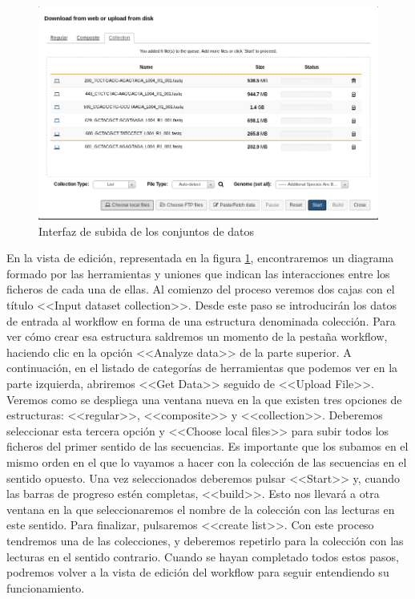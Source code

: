 \begin{figure}[!h]
    \begin{center}
      \includegraphics[scale=0.55]{images/SubidaDatasets.png}
      \caption{Interfaz de subida de los conjuntos de datos}
      \label{fig:SubidaDatasets}
    \end{center}
\end{figure}

En la vista de edición, representada en la figura \ref{fig:SubidaDatasets}, encontraremos un diagrama formado por las herramientas y uniones que indican las interacciones entre los ficheros de cada una de ellas. Al comienzo del proceso veremos dos cajas con el título <<Input dataset collection>>. Desde este paso se introducirán los datos de entrada al workflow en forma de una estructura denominada colección. Para ver cómo crear esa estructura saldremos un momento de la pestaña workflow, haciendo clic en la opción <<Analyze data>> de la parte superior. A continuación, en el listado de categorías de herramientas que podemos ver en la parte izquierda, abriremos <<Get Data>> seguido de <<Upload File>>. Veremos como se despliega una ventana nueva en la que existen tres opciones de estructuras: <<regular>>, <<composite>> y <<collection>>. Deberemos seleccionar esta tercera opción y <<Choose local files>> para subir todos los ficheros del primer sentido de las secuencias. Es importante que los subamos en el mismo orden en el que lo vayamos a hacer con la colección de las secuencias en el sentido opuesto. Una vez seleccionados deberemos pulsar <<Start>> y, cuando las barras de progreso estén completas, <<build>>. Esto nos llevará a otra ventana en la que seleccionaremos el nombre de la colección con las lecturas en este sentido. Para finalizar, pulsaremos <<create list>>. Con este proceso tendremos una de las colecciones, y deberemos repetirlo para la colección con las lecturas en el sentido contrario. Cuando se hayan completado todos estos pasos, podremos volver a la vista de edición del workflow para seguir entendiendo su funcionamiento.


